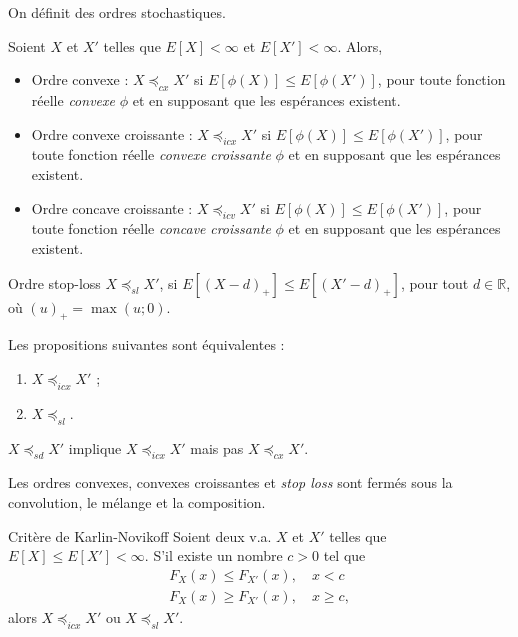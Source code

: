 On définit des ordres stochastiques. 

\begin{definition}{}{}
	Soient $X$ et $X'$ telles que $E[X] < \infty$ et $E[X'] < \infty$. Alors, 
	\begin{itemize}
		\item Ordre convexe : $X\preceq_{cx} X'$ si $E[\phi(X)] \leq E[\phi(X')]$, pour toute fonction réelle \textit{convexe} $\phi$ et en supposant que les espérances existent. 
		\item Ordre convexe croissante : $X\preceq_{icx} X'$ si $E[\phi(X)] \leq E[\phi(X')]$, pour toute fonction réelle \textit{convexe} \textit{croissante} $\phi$ et en supposant que les espérances existent. 
		\item Ordre concave croissante : $X\preceq_{icv} X'$ si $E[\phi(X)] \leq E[\phi(X')]$, pour toute fonction réelle \textit{concave} \textit{croissante} $\phi$ et en supposant que les espérances existent. 
	\end{itemize}
\end{definition}

\begin{definition}{Ordre stop-loss}{}
	$X\preceq_{sl}X'$, si $E[(X-d)_+] \leq E[(X'-d)_+]$, pour tout $d\in \mathbb{R}$, où $(u)_+ = \max(u;0)$.
\end{definition}

\begin{theoreme}{}{}
	Les propositions suivantes sont équivalentes : 
	\begin{enumerate}
		\item $X \preceq_{icx} X'$ ;
		\item $X \preceq_{sl}$. 
	\end{enumerate}
\end{theoreme}

\begin{remarque}{}{}
	$X\preceq_{sd} X'$ implique $X \preceq_{icx} X'$ mais pas $X\preceq_{cx} X'$. 
\end{remarque}

Les ordres convexes, convexes croissantes et \textit{stop loss} sont fermés sous la convolution, le mélange et la composition.

\begin{proposition}{Critère de Karlin-Novikoff}{}
	Soient deux v.a. $X$ et $X'$ telles que $E[X] \leq E[X'] < \infty$. S'il existe un nombre $c>0$ tel que 
	\begin{align*}
	F_X(x) \leq F_{X'}(x), \quad x<c\\
	F_X(x) \geq F_{X'}(x), \quad x\geq c,
	\end{align*}
	alors $X\preceq_{icx} X'$ ou $X\preceq_{sl} X'$. 
\end{proposition}

